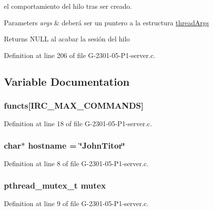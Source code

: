 el comportamiento del hilo tras ser creado. 


\begin{DoxyParams}{Parameters}
{\em args} & deberá ser un puntero a la estructura \hyperlink{structthread_args}{thread\-Args}\\
\hline
\end{DoxyParams}
\begin{DoxyReturn}{Returns}
N\-U\-L\-L al acabar la sesión del hilo 
\end{DoxyReturn}


Definition at line 206 of file G-\/2301-\/05-\/\-P1-\/server.\-c.



\subsection{Variable Documentation}
\hypertarget{_g-2301-05-_p1-server_8c_a3b74f15bfc2af0a575608c31e269694a}{
\subsubsection[{functs}]{ functs\mbox{[}I\-R\-C\-\_\-\-M\-A\-X\-\_\-\-C\-O\-M\-M\-A\-N\-D\-S\mbox{]}}}\label{_g-2301-05-_p1-server_8c_a3b74f15bfc2af0a575608c31e269694a}


Definition at line 18 of file G-\/2301-\/05-\/\-P1-\/server.\-c.

\hypertarget{_g-2301-05-_p1-server_8c_af203df082d5c6dcaa0c88b07cf86466d}{
\subsubsection[{hostname}]{\setlength{\rightskip}{0pt plus 5cm}char$\ast$ hostname = \char`\"{}John\-Titor\char`\"{}}}\label{_g-2301-05-_p1-server_8c_af203df082d5c6dcaa0c88b07cf86466d}


Definition at line 8 of file G-\/2301-\/05-\/\-P1-\/server.\-c.

\hypertarget{_g-2301-05-_p1-server_8c_a4acff8232e4aec9cd5c6dc200ac55ef3}{
\subsubsection[{mutex}]{\setlength{\rightskip}{0pt plus 5cm}pthread\-\_\-mutex\-\_\-t mutex}}\label{_g-2301-05-_p1-server_8c_a4acff8232e4aec9cd5c6dc200ac55ef3}


Definition at line 9 of file G-\/2301-\/05-\/\-P1-\/server.\-c.

